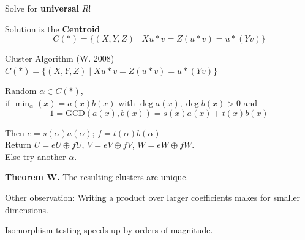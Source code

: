 \documentclass{beamer}
\DeclareMathOperator{\Span}{Span}
\begin{document}
\begin{frame}[fragile]
    Solve for \textbf{universal} $R$!

    \centering

    Solution is the \textbf{Centroid}
    \[
        C(*)=\{(X,Y,Z)\mid Xu*v=Z(u*v)=u*(Yv)\}
    \]
\end{frame}

\begin{frame}{Cluster Algorithm (W. 2008)}
    $C(*)=\{(X,Y,Z)\mid  Xu*v=Z(u*v)=u*(Yv)\}$

    Random $\alpha\in C(*)$, \\
    if $\min_{\alpha}(x)=a(x) b(x)$ with $\deg a(x),\deg b(x)>0$ and 
    \[1=\mathrm{GCD}(a(x),b(x))=s(x)a(x)+t(x)b(x)\]

    Then $e = s(\alpha )a(\alpha)$; $f=t(\alpha)b(\alpha)$\\
    Return $U=eU\oplus fU$, $V=eV\oplus fV$, $W=eW\oplus fW$.\\
    
    Else try another $\alpha$. 

    \bigskip

    \textbf{Theorem W.} The resulting clusters are unique.

\end{frame}

\begin{frame}
    Other observation:  Writing a product over larger coefficients makes for smaller 
    dimensions.  

    Isomorphism testing speeds up by orders of magnitude.
\end{frame}
\end{document}
